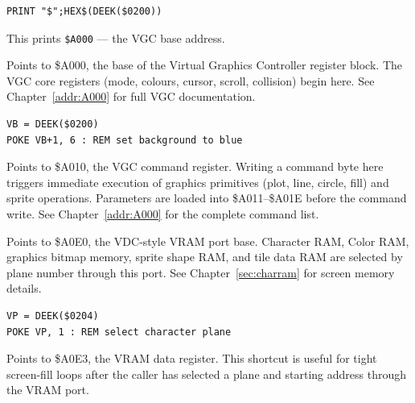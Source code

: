 \begin{lstlisting}
PRINT "$";HEX$(DEEK($0200))
\end{lstlisting}

This prints \texttt{\$A000} --- the VGC base address.



Points to \$A000, the base of the Virtual Graphics Controller register block.
The VGC core registers (mode, colours, cursor, scroll, collision) begin here.
See Chapter~\ref{addr:A000} for full VGC documentation.

\begin{lstlisting}
VB = DEEK($0200)
POKE VB+1, 6 : REM set background to blue
\end{lstlisting}



Points to \$A010, the VGC command register.  Writing a command byte here
triggers immediate execution of graphics primitives (plot, line, circle, fill)
and sprite operations.  Parameters are loaded into \$A011--\$A01E before the
command write.  See Chapter~\ref{addr:A000} for the complete command list.



Points to \$A0E0, the VDC-style VRAM port base. Character RAM, Color RAM,
graphics bitmap memory, sprite shape RAM, and tile data RAM are selected by
plane number through this port.
See Chapter~\ref{sec:charram} for screen memory details.

\begin{lstlisting}
VP = DEEK($0204)
POKE VP, 1 : REM select character plane
\end{lstlisting}



Points to \$A0E3, the VRAM data register. This shortcut is useful for tight
screen-fill loops after the caller has selected a plane and starting address
through the VRAM port.

